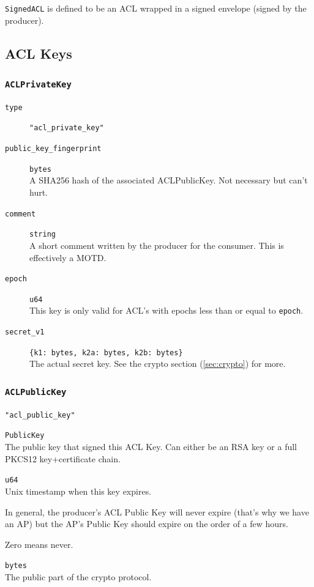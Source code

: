 \documentclass[pdftex,12pt,a4papaer,twoside,notitlepage]{report}
\begin{document}
\texttt{SignedACL} is defined to be an ACL wrapped in a signed envelope (signed
by the producer).

\subsection{ACL Keys}

\subsubsection{\texttt{ACLPrivateKey}}

\begin{leftbar}
\begin{description}
\item[\texttt{type}] \verb="acl_private_key"=
\item[\texttt{public\_key\_fingerprint}] \texttt{bytes} \\
  A SHA256 hash of the associated ACLPublicKey. Not necessary but can't hurt.

\item[\texttt{comment}] \texttt{string} \\
  A short comment written by the producer for the consumer. This is effectively a MOTD.
\item[\texttt{epoch}] \texttt{u64} \\
  This key is only valid for ACL's with epochs less than or equal to \texttt{epoch}.
\item[\texttt{secret\_v1}] \verb={k1: bytes, k2a: bytes, k2b: bytes}= \\
  The actual secret key. See the crypto section (\cref{sec:crypto}) for more.
\end{description}
\end{leftbar}

\subsubsection{\texttt{ACLPublicKey}}

\begin{leftbar}
\begin{description}[labelindent=2em,leftmargin=3em]
\item[\texttt{type}] \verb="acl_public_key"=
\item[\texttt{signing\_key}] \texttt{PublicKey} \\
  The public key that signed this ACL Key. Can either be an RSA key or a
  full PKCS12 key+certificate chain.

\item[\texttt{expires}] \texttt{u64} \\
  Unix timestamp when this key expires.

  In general, the producer's ACL Public Key will never expire (that's why we
  have an AP) but the AP's Public Key should expire on the order of a few
  hours.
  
  Zero means never.

\item[\texttt{public\_v1}] \texttt{bytes} \\
  The public part of the crypto protocol.
\end{description}
\end{leftbar}
\end{document}
